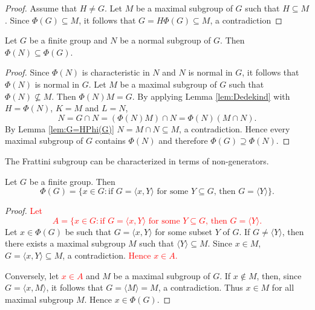 \begin{proof}
	Assume that $H\ne G$. Let $M$ be a maximal subgroup of $G$ such that
	$H\subseteq M$. Since $\Phi(G)\subseteq M$, it follows that $G=H\Phi(G)\subseteq M$, a contradiction
\end{proof}

\begin{proposition}
	\label{pro:phi(N)phi(G)}
	Let $G$ be a finite group and $N$ be a normal subgroup of $G$. Then $\Phi(N)\subseteq\Phi(G)$.
\end{proposition}

\begin{proof}
	Since $\Phi(N)$ is characteristic in $N$ and $N$ is normal in $G$, it follows that 
	$\Phi(N)$
	is normal in $G$.  Let $M$ be a maximal subgroup of $G$ such that 
	$\Phi(N)\not\subseteq M$.  Then $\Phi(N)M=G$.
	By applying Lemma \ref{lem:Dedekind} with 
	$H=\Phi(N)$, $K=M$ and $L=N$,   
	\[
		N=G\cap N=(\Phi(N)M)\cap N=\Phi(N)(M\cap N).
	\]
	By Lemma \ref{lem:G=HPhi(G)} $N=M\cap N\subseteq M$, a contradiction. Hence every maximal subgroup of $G$ 
	contains $\Phi(N)$ and therefore $\Phi(G)\supseteq\Phi(N)$. 
\end{proof}

The Frattini subgroup can be characterized in terms of non-generators.  

\begin{lemma}
	\label{lemma:nongenerators}
	Let $G$ be a finite group. Then 
	\[
	\Phi(G)=\{x\in G:\text{if $G=\langle x,Y\rangle$ for some $Y\subseteq G$, then $G=\langle Y\rangle$}\}.
	\]
\end{lemma}

\begin{proof}
    \textcolor{red}{Let 
    \[ A=\{x\in G:\text{if $G=\langle x,Y\rangle$ for some $Y\subseteq G$, then $G=\langle Y\rangle$} .\]}
	Let $x\in\Phi(G)$ be such that $G=\langle
	x,Y\rangle$ for some subset $Y$ of $G$. If $G\ne \langle Y\rangle$, then 
	there exists a maximal subgroup $M$ such that $\langle Y\rangle\subseteq M$. Since 
	$x\in M$, $G=\langle x,Y\rangle\subseteq M$, a contradiction.
	\textcolor{red}{Hence $x\in A$.}
	
	Conversely, 
	let \textcolor{red}{$x\in A$} and $M$ be a maximal subgroup of $G$. If $x\not\in M$, then, since $G=\langle
	x,M\rangle$, it follows that $G=\langle M\rangle=M$, a contradiction. Thus $x\in M$ for all
	maximal subgroup $M$. Hence $x\in \Phi(G)$. 
\end{proof}

